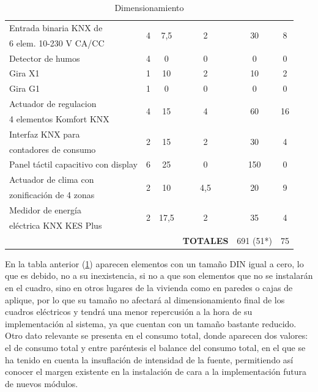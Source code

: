 \begin{flushleft}
\begin{table}[H]
\begin{tabular}{|p{4cm}|c|c|c|c|c|}
\hline
\rule[0mm]{0mm}{4mm}
Entrada binaria KNX de &  \multirow{2}{*}{4} &  \multirow{2}{*}{7,5} &  \multirow{2}{*}{2} &  \multirow{2}{*}{30} &  \multirow{2}{*}{8}\\
 6 elem. 10-230 V CA/CC & & & & &\\
\hline
\rule[0mm]{0mm}{4mm}
 Detector de humos & 4 & 0  & 0 & 0 & 0\\
\hline
\rule[0mm]{0mm}{4mm}
Gira X1 & 1 & 10 & 2 & 10 & 2\\
\hline
\rule[0mm]{0mm}{4mm}
Gira G1 & 1 & 0 & 0 & 0 & 0\\
\hline
\rule[0mm]{0mm}{4mm}
Actuador de regulacion  &  \multirow{2}{*}{4} &  \multirow{2}{*}{15} &  \multirow{2}{*}{4} &  \multirow{2}{*}{60} &  \multirow{2}{*}{16}\\
4 elementos Komfort KNX & & & & &\\
\hline
\rule[0mm]{0mm}{4mm}
Interfaz KNX para &  \multirow{2}{*}{2} &  \multirow{2}{*}{15} &  \multirow{2}{*}{2} & \multirow{2}{*}{30} & \multirow{2}{*}{4}\\
contadores de consumo  & & & & &\\
\hline
\rule[0mm]{0mm}{4mm}
Panel táctil capacitivo con display & 6 & 25 & 0 & 150 & 0\\
\hline
\rule[0mm]{0mm}{4mm}
Actuador de clima con &\multirow{2}{*}{2} & \multirow{2}{*}{10} & \multirow{2}{*}{4,5} & \multirow{2}{*}{20} & \multirow{2}{*}{9}\\
zonificación de 4 zonas   & & & & &\\
\hline
\rule[0mm]{0mm}{4mm}
Medidor de energía  & \multirow{2}{*}{2} & \multirow{2}{*}{17,5} & \multirow{2}{*}{2} & \multirow{2}{*}{35} & \multirow{2}{*}{4} \\
eléctrica KNX KES Plus & & & & &\\
\hline
\hline
\rule[0mm]{0mm}{4mm}
 & & &\textbf{TOTALES}&691 (51*)&75\\
\hline
\end{tabular}
\caption{Dimensionamiento}
\label{tab:tabla_dimensionamiento}
\end{table}
\end{flushleft}

En la tabla anterior (\ref{tab:tabla_dimensionamiento}) aparecen elementos con un tamaño DIN igual a cero, lo que es debido, no a su inexistencia, si no a que son elementos que no se instalarán en el cuadro, sino en otros lugares de la vivienda como en paredes o cajas de aplique, por lo que su tamaño no afectará al dimensionamiento final de los cuadros eléctricos y tendrá una menor repercusión a la hora de su implementación al sistema, ya que cuentan con un tamaño bastante reducido.\\
Otro dato relevante se presenta en el consumo total, donde aparecen dos valores: el de consumo total y entre paréntesis el balance del consumo total, en el que se ha tenido en cuenta la insuflación de intensidad de la fuente, permitiendo así conocer el margen existente en la instalación de cara a la implementación futura de nuevos módulos.

